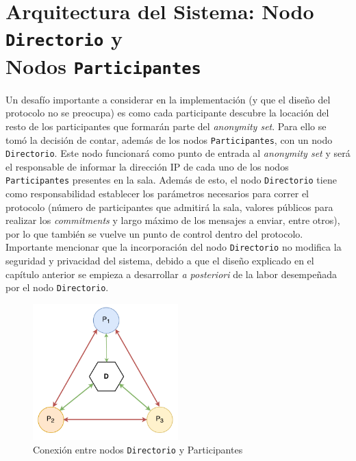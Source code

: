 \section{Arquitectura del Sistema: Nodo \texttt{Directorio} y \\
Nodos \texttt{Participantes}}

Un desafío importante a considerar en la implementación (y que el diseño del 
protocolo no se preocupa) es como cada participante descubre la locación del 
resto de los participantes que formarán parte del \emph{anonymity set}. Para 
ello se tomó la decisión de contar, además de los nodos 
\texttt{Participantes}, con un nodo \texttt{Directorio}. Este nodo funcionará 
como punto de entrada al \emph{anonymity set} y será el responsable de 
informar la dirección IP de cada uno de los nodos \texttt{Participantes} 
presentes en la sala. Además de esto, el nodo \texttt{Directorio} tiene como 
responsabilidad establecer los parámetros necesarios para correr el protocolo 
(número de participantes que admitirá la sala, valores públicos para realizar 
los \emph{commitments} y largo máximo de los mensajes a enviar, entre otros), 
por lo que también se vuelve un punto de control dentro del protocolo. 
Importante mencionar que la incorporación del nodo \texttt{Directorio} no 
modifica la seguridad y privacidad del sistema, debido a que el diseño 
explicado en el capítulo anterior se empieza a desarrollar \emph{a posteriori} 
de la labor desempeñada por el nodo 
\texttt{Directorio}.

\begin{figure}[H]
  \centering
    \includegraphics[width=0.5\textwidth]{imagenes/architecture.pdf}
  \caption{Conexión entre nodos \texttt{Directorio} y Participantes}
  \label{fig:connections-directory-participants}
\end{figure}

